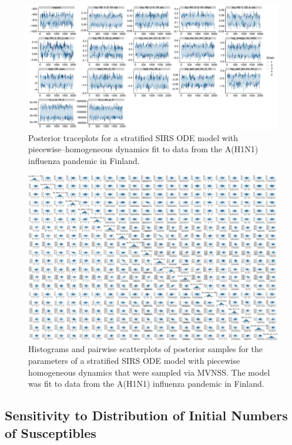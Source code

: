 \begin{figure}
	\centering
	\includegraphics[width=\linewidth]{figures/flu_traces_const_ode}
	\caption{Posterior traceplots for a stratified SIRS ODE model with piecewise--homogeneous dynamics fit to data from the A(H1N1) influenza pandemic in Finland.}
	\label{fig:fluconstodetraces}
\end{figure}


\begin{figure}
	\centering
	\includegraphics[width=\linewidth]{figures/flu_const_pairs}
	\caption{Histograms and pairwise scatterplots of posterior samples for the parameters of a stratified SIRS ODE model with piecewise homogeneous dynamics that were sampled via MVNSS. The model was fit to data from the A(H1N1) influenza pandemic in Finland.}
	\label{fig:fluconstpairs}
\end{figure}

\subsection{Sensitivity to Distribution of Initial Numbers of Susceptibles}
\label{subsec:flu_highsusc_sensitivity}